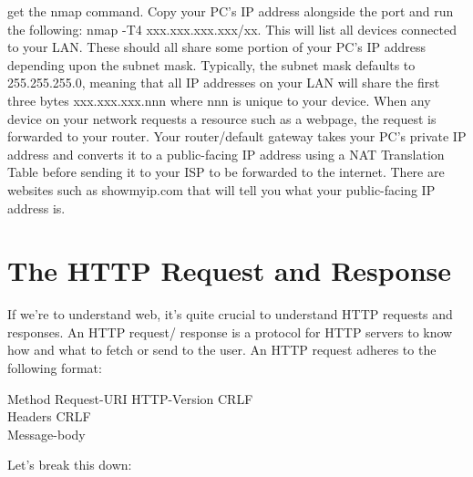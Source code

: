 \documentclass{article}
\begin{document}
get the nmap command. Copy your PC's IP address alongside the port and run the following:
nmap -T4 xxx.xxx.xxx.xxx/xx. This will list all devices connected to your LAN. These should all share some
portion of your PC's IP address depending upon the subnet mask. Typically, the subnet mask defaults to
255.255.255.0, meaning that all IP addresses on your LAN will share the first three bytes xxx.xxx.xxx.nnn where
nnn is unique to your device. When any device on your network requests a resource such as a webpage, the
request is forwarded to your router. Your router/default gateway takes your PC's private IP address and
converts it to a public-facing IP address using a NAT Translation Table before sending it to your ISP to be
forwarded to the internet. There are websites such as showmyip.com that will tell you what your public-facing
IP address is.

\section{The HTTP Request and Response}

If we're to understand web, it's quite crucial to understand HTTP requests and responses. An HTTP request/
response is a protocol for HTTP servers to know how and what to fetch or send to the user. An HTTP request
adheres to the following format:

Method Request-URI HTTP-Version CRLF\\
Headers CRLF\\
Message-body

Let's break this down:
\end{document}

